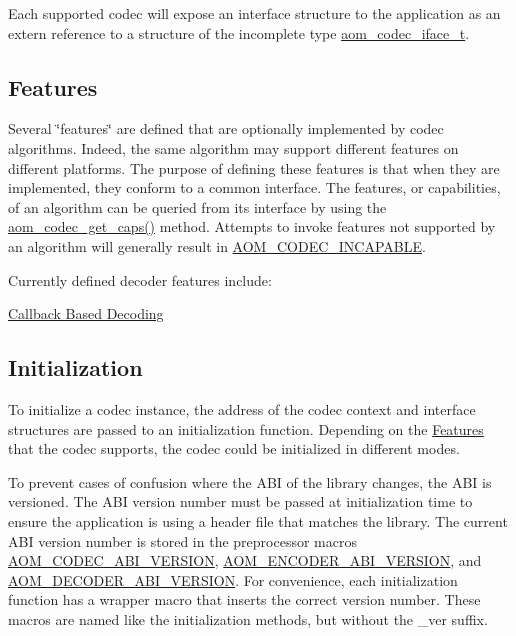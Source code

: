 Each supported codec will expose an interface structure to the application as an {\ttfamily extern} reference to a structure of the incomplete type \hyperlink{group__codec_ga4ef55b44c762836d1550e11921bed403}{aom\+\_\+codec\+\_\+iface\+\_\+t}.\hypertarget{usage_usage_features}{}\subsection{Features}\label{usage_usage_features}
Several \char`\"{}features\char`\"{} are defined that are optionally implemented by codec algorithms. Indeed, the same algorithm may support different features on different platforms. The purpose of defining these features is that when they are implemented, they conform to a common interface. The features, or capabilities, of an algorithm can be queried from it\textquotesingle{}s interface by using the \hyperlink{group__codec_ga66b1d3c795c3868efc88d73d01439461}{aom\+\_\+codec\+\_\+get\+\_\+caps()} method. Attempts to invoke features not supported by an algorithm will generally result in \hyperlink{group__codec_ggaaae61e0f8663e6137f1e228757248e7cac4a4eea6394661cef74abf674c12cfa8}{A\+O\+M\+\_\+\+C\+O\+D\+E\+C\+\_\+\+I\+N\+C\+A\+P\+A\+B\+LE}.

Currently defined decoder features include\+:
\begin{DoxyItemize}
\item \hyperlink{usage_decode_usage_cb}{Callback Based Decoding}
\end{DoxyItemize}\hypertarget{usage_usage_init}{}\subsection{Initialization}\label{usage_usage_init}
To initialize a codec instance, the address of the codec context and interface structures are passed to an initialization function. Depending on the \hyperlink{usage_usage_features}{Features} that the codec supports, the codec could be initialized in different modes.

To prevent cases of confusion where the A\+BI of the library changes, the A\+BI is versioned. The A\+BI version number must be passed at initialization time to ensure the application is using a header file that matches the library. The current A\+BI version number is stored in the preprocessor macros \hyperlink{group__codec_ga801627e3edca037cef7a92f7fecd75ef}{A\+O\+M\+\_\+\+C\+O\+D\+E\+C\+\_\+\+A\+B\+I\+\_\+\+V\+E\+R\+S\+I\+ON}, \hyperlink{group__encoder_gae4af664f2049d5b7d7b644d9a61d497c}{A\+O\+M\+\_\+\+E\+N\+C\+O\+D\+E\+R\+\_\+\+A\+B\+I\+\_\+\+V\+E\+R\+S\+I\+ON}, and \hyperlink{group__decoder_ga23378c7ca8c361c097181aaaa2a5a734}{A\+O\+M\+\_\+\+D\+E\+C\+O\+D\+E\+R\+\_\+\+A\+B\+I\+\_\+\+V\+E\+R\+S\+I\+ON}. For convenience, each initialization function has a wrapper macro that inserts the correct version number. These macros are named like the initialization methods, but without the \+\_\+ver suffix.

